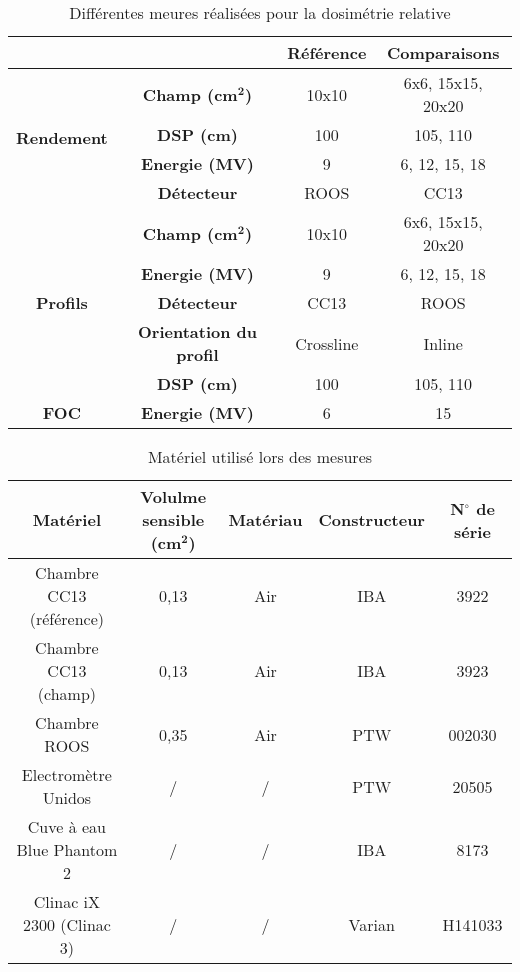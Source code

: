 \documentclass{article}
\begin{document}
\begin{table}[h]
  \centering
  \begin{tabular}{cc|c|c|}
  \cline{3-4}
   &  & \textbf{Référence} & \textbf{Comparaisons} \\ \hline
  \multicolumn{1}{|c|}{\multirow{4}{*}{\textbf{Rendement}}} & \textbf{Champ (cm}$\mathbf{^2}$\textbf{)} & 10x10 & 6x6, 15x15, 20x20 \\
  \multicolumn{1}{|c|}{} & \textbf{DSP (cm)} & 100 & 105, 110 \\
  \multicolumn{1}{|c|}{} & \textbf{Energie (MV)} & 9 & 6, 12, 15, 18 \\
  \multicolumn{1}{|c|}{} & \textbf{Détecteur} & ROOS & CC13 \\ \hline
  \multicolumn{1}{|c|}{\multirow{5}{*}{\textbf{Profils}}} & \textbf{Champ (cm}$\mathbf{^2}$\textbf{)} & 10x10 & 6x6, 15x15, 20x20 \\
  \multicolumn{1}{|c|}{} & \textbf{Energie (MV)} & 9 & 6, 12, 15, 18 \\
  \multicolumn{1}{|c|}{} & \textbf{Détecteur} & CC13 & ROOS \\
  \multicolumn{1}{|c|}{} & \textbf{Orientation du profil} & Crossline & Inline \\
  \multicolumn{1}{|c|}{} & \textbf{DSP (cm)} & 100 & 105, 110 \\ \hline
  \multicolumn{1}{|c|}{\textbf{FOC}} & \textbf{Energie (MV)} & 6 & 15 \\ \hline
  \end{tabular}
  \caption{Différentes meures réalisées pour la dosimétrie relative}
  \label{table_mesures}
\end{table}

\begin{table}[h]
  \centering
  \begin{tabular}{ccccc}
    \toprule
    \textbf{Matériel} & \textbf{Volulme sensible (cm}$\mathbf{^2}$\textbf{)} & \textbf{Matériau} & \textbf{Constructeur} & \textbf{N$^{\circ}$ de série}\\
    \toprule
    Chambre CC13 (référence) & 0,13 & Air & IBA & 3922 \\
    Chambre CC13 (champ) & 0,13 & Air & IBA & 3923 \\
    Chambre ROOS & 0,35 & Air & PTW & 002030 \\
    Electromètre Unidos & / & / & PTW & 20505 \\
    Cuve à eau Blue Phantom 2 & / & / & IBA & 8173 \\
    Clinac iX 2300 (Clinac 3) & / & / & Varian & H141033 \\
    \bottomrule
  \end{tabular}
  \caption{Matériel utilisé lors des mesures}
  \label{table_matos}
\end{table}
\end{document}
